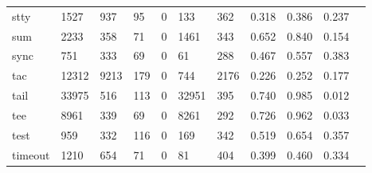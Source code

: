 \begin{longtable}{lp{1.10cm}p{1.10cm}p{1.10cm}p{1.10cm}p{1.10cm}p{1.10cm}p{1.10cm}p{1.10cm}p{1.10cm}p{1.10cm}}
stty      &                   1527 &                                937 &                                95 &                                0 &                               133 &                             362 &                          0.318 &                                 0.386 &                               0.237 \\
sum       &                   2233 &                                358 &                                71 &                                0 &                              1461 &                             343 &                          0.652 &                                 0.840 &                               0.154 \\
sync      &                    751 &                                333 &                                69 &                                0 &                                61 &                             288 &                          0.467 &                                 0.557 &                               0.383 \\
tac       &                  12312 &                               9213 &                               179 &                                0 &                               744 &                            2176 &                          0.226 &                                 0.252 &                               0.177 \\
tail      &                  33975 &                                516 &                               113 &                                0 &                             32951 &                             395 &                          0.740 &                                 0.985 &                               0.012 \\
tee       &                   8961 &                                339 &                                69 &                                0 &                              8261 &                             292 &                          0.726 &                                 0.962 &                               0.033 \\
test      &                    959 &                                332 &                               116 &                                0 &                               169 &                             342 &                          0.519 &                                 0.654 &                               0.357 \\
timeout   &                   1210 &                                654 &                                71 &                                0 &                                81 &                             404 &                          0.399 &                                 0.460 &                               0.334 \\

\end{longtable}
